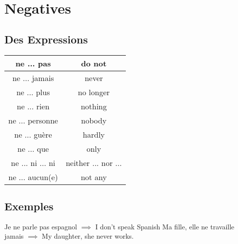 \documentclass[11pt,twoside]{article}
\begin{document}
	\section{Negatives}
		\subsection{Des Expressions}
			\begin{tabular}{|c|c|} \hline
				ne ... pas & do not \\ \hline
				ne ... jamais & never \\ \hline
				ne ... plus & no longer \\ \hline
				ne ... rien & nothing \\ \hline
				ne ... personne & nobody \\ \hline
				ne ... guère & hardly \\ \hline
				ne ... que & only \\ \hline
				ne ... ni ... ni & neither ... nor ... \\ \hline
				ne ... aucun(e) & not any \\ \hline
			\end{tabular}
		\subsection{Exemples}
			Je ne parle pas espagnol $\implies$ I don't speak Spanish
			Ma fille, elle ne travaille jamais $\implies$ My daughter, she never works.
\end{document}
